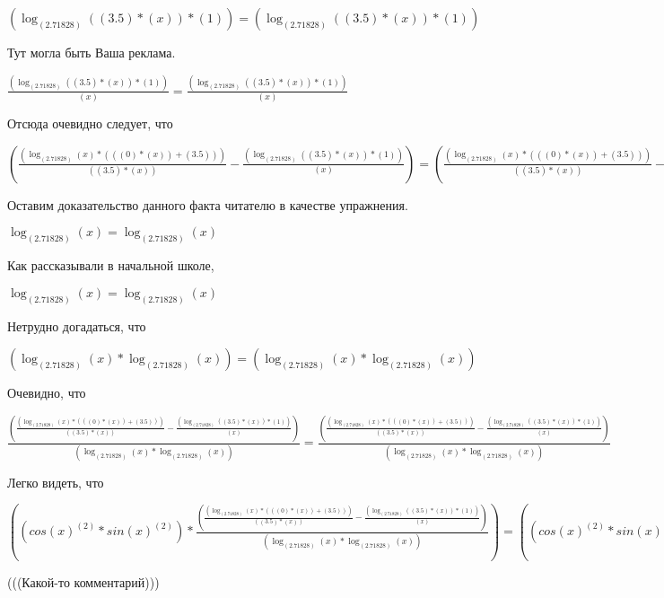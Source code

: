 \documentclass[12pt,a4paper,fleqn]{article}
\theoremstyle{definition}
\begin{document}
$(\log_{( 2.71828 )}{(( 3.5 ) * ( x ))} * ( 1 )) = (\log_{( 2.71828 )}{(( 3.5 ) * ( x ))} * ( 1 ))$

Тут могла быть Ваша реклама.

$\frac{(\log_{( 2.71828 )}{(( 3.5 ) * ( x ))} * ( 1 ))}{( x )}
 = \frac{(\log_{( 2.71828 )}{(( 3.5 ) * ( x ))} * ( 1 ))}{( x )}
$

Отсюда очевидно следует, что

$(\frac{(\log_{( 2.71828 )}{( x )} * ((( 0 ) * ( x )) + ( 3.5 )))}{(( 3.5 ) * ( x ))}
 - \frac{(\log_{( 2.71828 )}{(( 3.5 ) * ( x ))} * ( 1 ))}{( x )}
) = (\frac{(\log_{( 2.71828 )}{( x )} * ((( 0 ) * ( x )) + ( 3.5 )))}{(( 3.5 ) * ( x ))}
 - \frac{(\log_{( 2.71828 )}{(( 3.5 ) * ( x ))} * ( 1 ))}{( x )}
)$

Оставим доказательство данного факта читателю в качестве упражнения.

$\log_{( 2.71828 )}{( x )} = \log_{( 2.71828 )}{( x )}$

Как рассказывали в начальной школе,

$\log_{( 2.71828 )}{( x )} = \log_{( 2.71828 )}{( x )}$

Нетрудно догадаться, что

$(\log_{( 2.71828 )}{( x )} * \log_{( 2.71828 )}{( x )}) = (\log_{( 2.71828 )}{( x )} * \log_{( 2.71828 )}{( x )})$

Очевидно, что

$\frac{(\frac{(\log_{( 2.71828 )}{( x )} * ((( 0 ) * ( x )) + ( 3.5 )))}{(( 3.5 ) * ( x ))}
 - \frac{(\log_{( 2.71828 )}{(( 3.5 ) * ( x ))} * ( 1 ))}{( x )}
)}{(\log_{( 2.71828 )}{( x )} * \log_{( 2.71828 )}{( x )})}
 = \frac{(\frac{(\log_{( 2.71828 )}{( x )} * ((( 0 ) * ( x )) + ( 3.5 )))}{(( 3.5 ) * ( x ))}
 - \frac{(\log_{( 2.71828 )}{(( 3.5 ) * ( x ))} * ( 1 ))}{( x )}
)}{(\log_{( 2.71828 )}{( x )} * \log_{( 2.71828 )}{( x )})}
$

Легко видеть, что

$((cos{( x )}^{( 2 )} * sin{( x )}^{( 2 )}) * \frac{(\frac{(\log_{( 2.71828 )}{( x )} * ((( 0 ) * ( x )) + ( 3.5 )))}{(( 3.5 ) * ( x ))}
 - \frac{(\log_{( 2.71828 )}{(( 3.5 ) * ( x ))} * ( 1 ))}{( x )}
)}{(\log_{( 2.71828 )}{( x )} * \log_{( 2.71828 )}{( x )})}
) = ((cos{( x )}^{( 2 )} * sin{( x )}^{( 2 )}) * \frac{(\frac{(\log_{( 2.71828 )}{( x )} * ((( 0 ) * ( x )) + ( 3.5 )))}{(( 3.5 ) * ( x ))}
 - \frac{(\log_{( 2.71828 )}{(( 3.5 ) * ( x ))} * ( 1 ))}{( x )}
)}{(\log_{( 2.71828 )}{( x )} * \log_{( 2.71828 )}{( x )})}
)$

(((Какой-то комментарий)))
\end{document}
